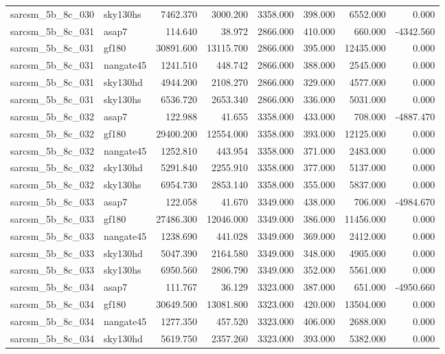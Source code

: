 \begin{tabular}{llrrrrrr}
sarcsm\_5b\_8c\_030 & sky130hs & 7462.370 & 3000.200 & 3358.000 & 398.000 & 6552.000 & 0.000 \\
sarcsm\_5b\_8c\_031 & asap7 & 114.640 & 38.972 & 2866.000 & 410.000 & 660.000 & -4342.560 \\
sarcsm\_5b\_8c\_031 & gf180 & 30891.600 & 13115.700 & 2866.000 & 395.000 & 12435.000 & 0.000 \\
sarcsm\_5b\_8c\_031 & nangate45 & 1241.510 & 448.742 & 2866.000 & 388.000 & 2545.000 & 0.000 \\
sarcsm\_5b\_8c\_031 & sky130hd & 4944.200 & 2108.270 & 2866.000 & 329.000 & 4577.000 & 0.000 \\
sarcsm\_5b\_8c\_031 & sky130hs & 6536.720 & 2653.340 & 2866.000 & 336.000 & 5031.000 & 0.000 \\
sarcsm\_5b\_8c\_032 & asap7 & 122.988 & 41.655 & 3358.000 & 433.000 & 708.000 & -4887.470 \\
sarcsm\_5b\_8c\_032 & gf180 & 29400.200 & 12554.000 & 3358.000 & 393.000 & 12125.000 & 0.000 \\
sarcsm\_5b\_8c\_032 & nangate45 & 1252.810 & 443.954 & 3358.000 & 371.000 & 2483.000 & 0.000 \\
sarcsm\_5b\_8c\_032 & sky130hd & 5291.840 & 2255.910 & 3358.000 & 377.000 & 5137.000 & 0.000 \\
sarcsm\_5b\_8c\_032 & sky130hs & 6954.730 & 2853.140 & 3358.000 & 355.000 & 5837.000 & 0.000 \\
sarcsm\_5b\_8c\_033 & asap7 & 122.058 & 41.670 & 3349.000 & 438.000 & 706.000 & -4984.670 \\
sarcsm\_5b\_8c\_033 & gf180 & 27486.300 & 12046.000 & 3349.000 & 386.000 & 11456.000 & 0.000 \\
sarcsm\_5b\_8c\_033 & nangate45 & 1238.690 & 441.028 & 3349.000 & 369.000 & 2412.000 & 0.000 \\
sarcsm\_5b\_8c\_033 & sky130hd & 5047.390 & 2164.580 & 3349.000 & 348.000 & 4905.000 & 0.000 \\
sarcsm\_5b\_8c\_033 & sky130hs & 6950.560 & 2806.790 & 3349.000 & 352.000 & 5561.000 & 0.000 \\
sarcsm\_5b\_8c\_034 & asap7 & 111.767 & 36.129 & 3323.000 & 387.000 & 651.000 & -4950.660 \\
sarcsm\_5b\_8c\_034 & gf180 & 30649.500 & 13081.800 & 3323.000 & 420.000 & 13504.000 & 0.000 \\
sarcsm\_5b\_8c\_034 & nangate45 & 1277.350 & 457.520 & 3323.000 & 406.000 & 2688.000 & 0.000 \\
sarcsm\_5b\_8c\_034 & sky130hd & 5619.750 & 2357.260 & 3323.000 & 393.000 & 5382.000 & 0.000 \\

\end{tabular}
